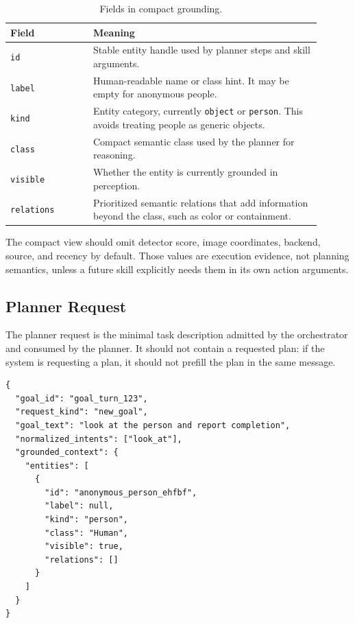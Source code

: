\documentclass[12pt,a4paper]{article}
\newcommand{\code}[1]{\texttt{#1}}
\begin{document}
\begin{longtable}{p{0.24\linewidth}p{0.66\linewidth}}
\caption{Fields in compact grounding.}\label{tab:grounding-fields}\\
\toprule
Field & Meaning\\
\midrule
\code{id} & Stable entity handle used by planner steps and skill arguments.\\
\code{label} & Human-readable name or class hint. It may be empty for anonymous people.\\
\code{kind} & Entity category, currently \code{object} or \code{person}. This avoids treating people as generic objects.\\
\code{class} & Compact semantic class used by the planner for reasoning.\\
\code{visible} & Whether the entity is currently grounded in perception.\\
\code{relations} & Prioritized semantic relations that add information beyond the class, such as color or containment.\\
\bottomrule
\end{longtable}

The compact view should omit detector score, image coordinates, backend, source, and recency by default. Those values are execution evidence, not planning semantics, unless a future skill explicitly needs them in its own action arguments.

\subsection{Planner Request}

The planner request is the minimal task description admitted by the orchestrator and consumed by the planner. It should not contain a requested plan: if the system is requesting a plan, it should not prefill the plan in the same message.

\begin{lstlisting}
{
  "goal_id": "goal_turn_123",
  "request_kind": "new_goal",
  "goal_text": "look at the person and report completion",
  "normalized_intents": ["look_at"],
  "grounded_context": {
    "entities": [
      {
        "id": "anonymous_person_ehfbf",
        "label": null,
        "kind": "person",
        "class": "Human",
        "visible": true,
        "relations": []
      }
    ]
  }
}
\end{lstlisting}
\end{document}
